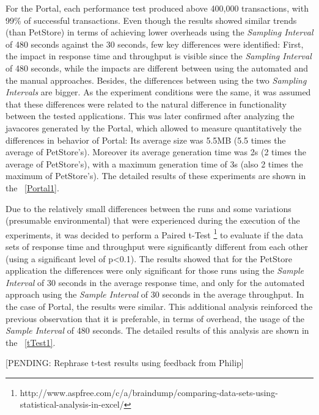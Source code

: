 \documentclass[runningheads,a4paper]{llncs}
\begin{document}
For the Portal, each performance test produced above 400,000 transactions,
with 99\% of successful transactions. Even though the results showed similar
trends (than PetStore) in terms of achieving lower overheads using the
\emph{Sampling Interval} of 480 seconds against the 30 seconds, few key 
differences were identified: First, the impact in response time and
throughput is visible since the \emph{Sampling Interval} of 480 seconds, 
while the impacts are different between using the automated and the manual
approaches. Besides, the differences between using the two \emph{Sampling Intervals} 
are bigger. As the experiment conditions were the same, it was assumed that these 
differences were related to the natural difference in functionality between the
tested applications. This was later confirmed after analyzing the javacores
generated by the Portal, which allowed to measure quantitatively the
differences in behavior of Portal: Its average size was 5.5MB (5.5 times the
average of PetStore's). Moreover its average generation time was 2s (2 times the 
average of PetStore's), with a maximum generation time of 3s (also 2 times the
maximum of PetStore's). The detailed results of these experiments are shown in the \tablename ~\ref{Portal1}.

Due to the relatively small differences between the runs and some variations
(presumable environmental) that were experienced during the execution of the
experiments, it was decided to perform a Paired t-Test
\footnote{http://www.aspfree.com/c/a/braindump/comparing-data-sets-using-statistical-analysis-in-excel/}
to evaluate if the data sets of response time and throughput were significantly
different from each other (using a significant level of p<0.1). The results
showed that for the PetStore application the differences were only significant for
those runs using the \emph{Sample Interval} of 30 seconds in the average
response time, and only for the automated approach using the \emph{Sample
Interval} of 30 seconds in the average throughput. In the case of Portal, the
results were similar. This additional analysis reinforced the
previous observation that it is preferable, in terms of overhead, the
usage of the \emph{Sample Interval} of 480 seconds. The detailed results of
this analysis are shown in the \tablename ~\ref{tTest1}.

 [PENDING: Rephrase t-test results using feedback from Philip]
\end{document}
